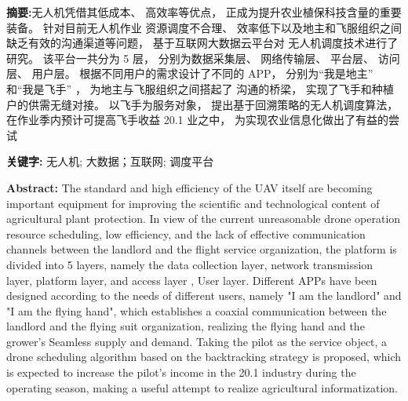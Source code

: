 \documentclass[UTF8,a4paper,10pt,nocolorlinks]{ctexart}
\begin{document}



    \begin{adjustwidth}{0cm}{0cm}
        \large{\textbf{摘\hspace{1em}要:}}无人机凭借其低成本、 高效率等优点， 正成为提升农业植保科技含量的重要装备。 针对目前无人机作业
资源调度不合理、 效率低下以及地主和飞服组织之间缺乏有效的沟通渠道等问题， 基于互联网大数据云平台对
无人机调度技术进行了研究。 该平台一共分为 5 层， 分别为数据采集层、 网络传输层、 平台层、 访问层、 用户层。
根据不同用户的需求设计了不同的 APP， 分别为“我是地主” 和“我是飞手” ， 为地主与飞服组织之间搭起了
沟通的桥梁， 实现了飞手和种植户的供需无缝对接。 以飞手为服务对象， 提出基于回溯策略的无人机调度算法，
在作业季内预计可提高飞手收益 20.1%
业之中， 为实现农业信息化做出了有益的尝试
        \begin{flushleft}
        \par\textbf{关键字: } 无人机; 大数据；互联网; 调度平台 %
        \end{flushleft}
    \end{adjustwidth}
  \begin{adjustwidth}{0cm}{0cm}
      \large{\textbf{Abstract: }}The standard and high efficiency of the UAV itself are becoming important equipment for improving the scientific and technological content of agricultural plant protection. In view of the current unreasonable drone operation resource scheduling, low efficiency, and the lack of effective communication channels between the landlord and the flight service organization, the platform is divided into 5 layers, namely the data collection layer, network transmission layer, platform layer, and access layer , User layer. Different APPs have been designed according to the needs of different users, namely "I am the landlord" and "I am the flying hand", which establishes a coaxial communication between the landlord and the flying suit organization, realizing the flying hand and the grower's Seamless supply and demand. Taking the pilot as the service object, a drone scheduling algorithm based on the backtracking strategy is proposed, which is expected to increase the pilot’s income in the 20.1 industry during the operating season, making a useful attempt to realize agricultural informatization.
  \end{adjustwidth}
\end{document}
